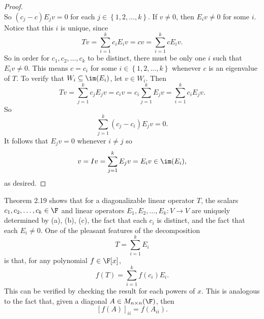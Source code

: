 \documentclass[math_245.tex]{subfiles}
\begin{document}
\begin{proof}
\begin{equation*}
        \end{equation*}
        So $(c_j-c)E_jv = 0$ for each $j\in \left\lbrace 1, 2, \ldots, k \right\rbrace$. If $v\neq 0$, then $E_iv\neq 0$ for some $i$. Notice that this $i$ is unique, since
        \begin{equation*}
            Tv = \sum^{k}_{i=1} c_iE_iv = cv = \sum^{k}_{i=1} cE_iv.
        \end{equation*}
        So in order for $c_1, c_2, \ldots, c_k$ to be distinct, there must be only one $i$ such that $E_iv\neq 0$. This means $c = c_i$ for some $i\in \left\lbrace 1, 2, \ldots, k \right\rbrace$ whenever $c$ is an eigenvalue of $T$. To verify that $W_i\subseteq \im(E_i)$, let $v\in W_i$. Then
        \begin{equation*}
            Tv = \sum^{k}_{j=1} c_jE_jv = c_iv = c_i \sum^{k}_{j=1} E_jv = \sum^{k}_{i=1} c_iE_jv.
        \end{equation*}
        So
        \begin{equation*}
            \sum^{k}_{j=1} \left( c_j - c_i \right) E_jv = 0. 
        \end{equation*}
        It follows that $E_jv = 0$ whenever $i\neq j$ so
        \begin{equation*}
            v = Iv = \sum^{k}_{j=1} E_jv = E_iv \in \im(E_i),
        \end{equation*}
        as desired.
    \end{proof}

    \begin{remark}
        Theorem 2.19 shows that for a diagonalizable linear operator $T$, the scalars $c_1, c_2, \ldots, c_k\in \F$ and linear operators $E_1, E_2, \ldots, E_k:V\to V$ are uniquely determined by (a), (b), (c), the fact that each $c_i$ is distinct, and the fact that each $E_i\neq 0$. One of the pleasant features of the decomposition
        \begin{equation*}
            T = \sum^{k}_{i=1} E_i
        \end{equation*}
        is that, for any polynomial $f\in \F[x]$,
        \begin{equation*}
            f(T) = \sum^{k}_{i=1} f(c_i)E_i.
        \end{equation*}
        This can be verified by checking the result for each powers of $x$. This is analogous to the fact that, given a diagonal $A\in M_{n\times n}(\F)$, then
        \begin{equation*}
            \left[ f(A) \right] _{ii} = f(A_{ii}).
        \end{equation*}
    \end{remark}
\end{document}
